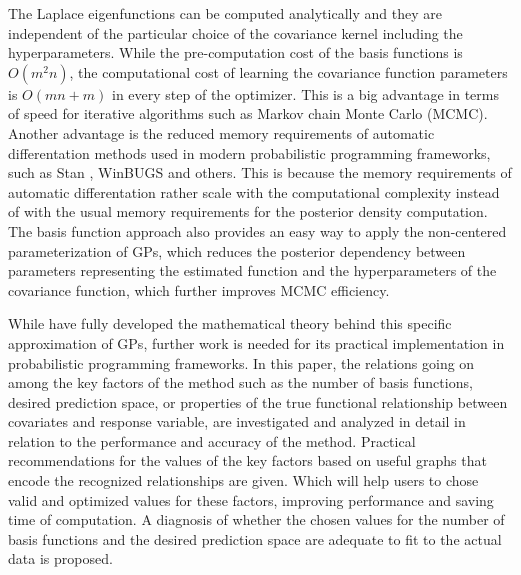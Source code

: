 \documentclass[onecolumn,a4paper,11pt]{article}
\begin{document}
The Laplace eigenfunctions can be computed analytically and they are independent of the particular choice of the covariance kernel including the hyperparameters. While the pre-computation cost of the basis functions is $O(m^2n)$, the computational cost of learning the covariance function parameters is $O(mn+m)$ in every step of the optimizer. This is a big advantage in terms of speed for iterative algorithms such as Markov chain Monte Carlo (MCMC). Another advantage is the reduced memory requirements of automatic differentation methods used in modern probabilistic programming frameworks, such as Stan \citep{carpenter2017stan}, WinBUGS \citep{lunn2000winbugs} and others. This is because the memory requirements of automatic differentation rather scale with the computational complexity instead of with the usual memory requirements for the posterior density computation. The basis function approach also provides an easy way to apply the non-centered parameterization of GPs, which reduces the posterior dependency between parameters representing the estimated function and the hyperparameters of the covariance function, which further improves MCMC efficiency.


While \citet{solin2018hilbert} have fully developed the mathematical theory behind this specific approximation of GPs, further work is needed for its practical implementation in probabilistic programming frameworks. In this paper, the relations going on among the key factors of the method such as the number of basis functions, desired prediction space, or properties of the true functional relationship between covariates and response variable, are investigated and analyzed in detail in relation to the performance and accuracy of the method. Practical recommendations for the values of the key factors based on useful graphs that encode the recognized relationships are given. Which will help users to chose valid and optimized values for these factors, improving performance and saving time of computation. A diagnosis of whether the chosen values for the number of basis functions and the desired prediction space are adequate to fit to the actual data is proposed.
\end{document}
